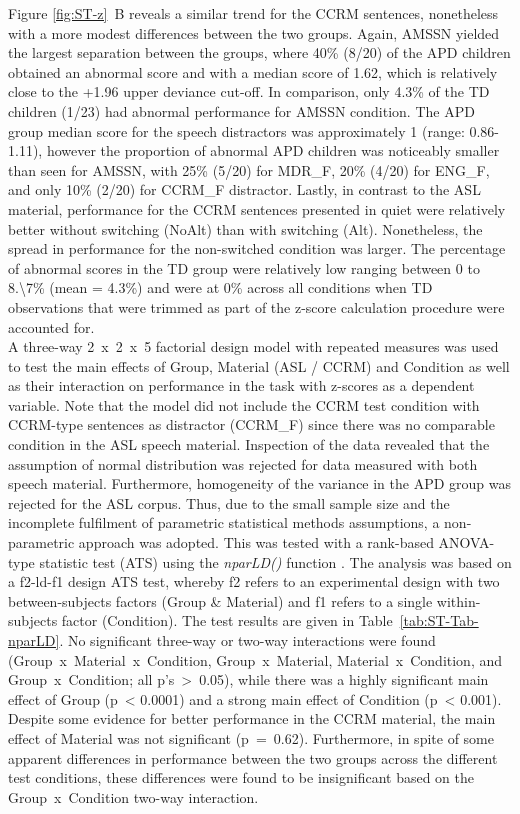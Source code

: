 \documentclass[a4paper, twoside]{templates/ociamthesis}
\begin{document}
Figure \ref{fig:ST-z}~B reveals a similar trend for the CCRM sentences, nonetheless with a more modest differences between the two groups. Again, AMSSN yielded the largest separation between the groups, where 40\% (8/20) of the APD children obtained an abnormal score and with a median score of 1.62, which is relatively close to the +1.96 upper deviance cut-off. In comparison, only 4.3\% of the TD children (1/23) had abnormal performance for AMSSN condition. The APD group median score for the speech distractors was approximately 1 (range: 0.86-1.11), however the proportion of abnormal APD children was noticeably smaller than seen for AMSSN, with 25\% (5/20) for MDR\_F, 20\% (4/20) for ENG\_F, and only 10\% (2/20) for CCRM\_F distractor. Lastly, in contrast to the ASL material, performance for the CCRM sentences presented in quiet were relatively better without switching (NoAlt) than with switching (Alt). Nonetheless, the spread in performance for the non-switched condition was larger. The percentage of abnormal scores in the TD group were relatively low ranging between 0 to 8.\textbackslash7\% (mean = 4.3\%) and were at 0\% across all conditions when TD observations that were trimmed as part of the z-score calculation procedure were accounted for.\\

A three-way 2~x~2~x~5 factorial design model with repeated measures was used to test the main effects of Group, Material (ASL / CCRM) and Condition as well as their interaction on performance in the task with z-scores as a dependent variable. Note that the model did not include the CCRM test condition with CCRM-type sentences as distractor (CCRM\_F) since there was no comparable condition in the ASL speech material. Inspection of the data revealed that the assumption of normal distribution was rejected for data measured with both speech material. Furthermore, homogeneity of the variance in the APD group was rejected for the ASL corpus. Thus, due to the small sample size and the incomplete fulfilment of parametric statistical methods assumptions, a non-parametric approach was adopted. This was tested with a rank-based ANOVA-type statistic test (ATS) using the \emph{nparLD()} function \autocite[nparLD package;][]{nparLDPackageR}. The analysis was based on a f2-ld-f1 design ATS test, whereby f2 refers to an experimental design with two between-subjects factors (Group \& Material) and f1 refers to a single within-subjects factor (Condition). The test results are given in Table~\ref{tab:ST-Tab-nparLD}. No significant three-way or two-way interactions were found (Group~x~Material~x~Condition, Group~x~Material, Material~x~Condition, and Group~x~Condition; all p's~\textgreater~0.05), while there was a highly significant main effect of Group (p~\textless{} 0.0001) and a strong main effect of Condition (p~\textless{} 0.001). Despite some evidence for better performance in the CCRM material, the main effect of Material was not significant (p~=~0.62). Furthermore, in spite of some apparent differences in performance between the two groups across the different test conditions, these differences were found to be insignificant based on the Group~x~Condition two-way interaction.\\
\end{document}
